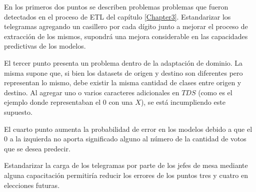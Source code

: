 En los primeros dos puntos se describen problemas problemas que fueron detectados en el proceso de ETL del capítulo
\ref{Chapter3}. Estandarizar los telegramas agregando un casillero por cada dígito junto a mejorar el proceso de
extracción de los mismos, supondrá una mejora considerable en las capacidades predictivas de los modelos.

El tercer punto presenta un problema dentro de la adaptación de dominio. La misma supone que, si bien los datasets de
origen y destino son diferentes pero representan lo mismo, debe existir la misma cantidad de clases entre origen y
destino. Al agregar uno o varios caracteres adicionales en $TDS$ (como es el ejemplo donde representaban el $0$ con una
$X$), se está incumpliendo este supuesto.

El cuarto punto aumenta la probabilidad de error en los modelos debido a que el $0$ a la izquierda no aporta
significado alguno al número de la cantidad de votos que se desea predecir.

Estandarizar la carga de los telegramas por parte de los jefes de mesa mediante alguna capacitación permitiría reducir
los errores de los puntos tres y cuatro en elecciones futuras.

